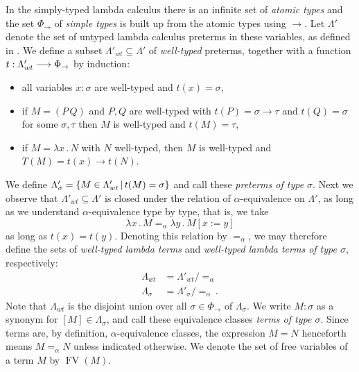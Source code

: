 \documentclass[english,letter paper,12pt,leqno]{article}
\theoremstyle{example}
\numberwithin{equation}{section}
\def\be{\begin{equation}}
\def\ee{\end{equation}}
\def\ldot{\,.\,}
\def\FV{\operatorname{FV}}
\def\typearrow{\rightarrow}
\begin{document}
In the simply-typed lambda calculus \cite[Chapter 3]{sorensen} there is an infinite set of \emph{atomic types} and the set $\Phi_{\typearrow}$ of \emph{simple types} is built up from the atomic types using $\typearrow$. Let $\Lambda'$ denote the set of untyped lambda calculus preterms in these variables, as defined in \cite[Chapter 1]{sorensen}. We define a subset $\Lambda'_{wt} \subseteq \Lambda'$ of \emph{well-typed} preterms, together with a function $t: \Lambda'_{wt} \lto \Phi_{\typearrow}$ by induction:
\begin{itemize}
\item all variables $x : \sigma$ are well-typed and $t(x) = \sigma$,
\item if $M = (P \, Q)$ and $P,Q$ are well-typed with $t(P) = \sigma \typearrow \tau$ and $t(Q) = \sigma$ for some $\sigma, \tau$ then $M$ is well-typed and $t(M) = \tau$,
\item if $M = \lambda x\ldot N$ with $N$ well-typed, then $M$ is well-typed and $T(M) = t(x) \typearrow t(N)$.
\end{itemize}
We define $\Lambda'_\sigma = \{ M \in \Lambda'_{wt} \,|\, t(M) = \sigma \}$ and call these \emph{preterms of type $\sigma$}. Next we observe that $\Lambda'_{wt} \subseteq \Lambda'$ is closed under the relation of $\alpha$-equivalence on $\Lambda'$, as long as we understand $\alpha$-equivalence type by type, that is, we take
\[
\lambda x \ldot M =_\alpha \lambda y\ldot M[x := y]
\]
as long as $t(x) = t(y)$. Denoting this relation by $=_\alpha$, we may therefore define the sets of \emph{well-typed lambda terms} and \emph{well-typed lambda terms of type $\sigma$}, respectively:
\begin{align}
\Lambda_{wt} &= \Lambda'_{wt} / =_\alpha\,\\
\Lambda_\sigma &= \Lambda'_\sigma / =_\alpha\,.
\end{align}
Note that $\Lambda_{wt}$ is the disjoint union over all $\sigma \in \Phi_{\typearrow}$ of $\Lambda_\sigma$. We write $M: \sigma$ as a synonym for $[M] \in \Lambda_\sigma$, and call these equivalence classes \emph{terms of type $\sigma$}. Since terms are, by definition, $\alpha$-equivalence classes, the expression $M = N$ henceforth means $M =_\alpha N$ unless indicated otherwise. We denote the set of free variables of a term $M$ by $\FV(M)$.

\end{document}
